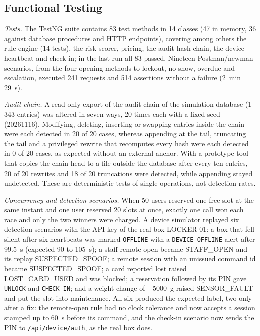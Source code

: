 \documentclass[manuscript,screen]{acmart}
\begin{document}
\subsection{Functional Testing}\label{sec:functional}

\textit{Tests.} The TestNG suite contains 83 test methods in 14 classes (47 in memory, 36 against database procedures
and HTTP endpoints), covering among others the rule engine (14 tests), the risk scorer, pricing, the audit hash chain,
the device heartbeat and check-in; in the last run all 83 passed. Nineteen Postman/newman scenarios, from the four
opening methods to lockout, no-show, overdue and escalation, executed 241 requests and 514 assertions without a failure
(2~min 29~s).

\textit{Audit chain.} A read-only export of the audit chain of the simulation database (1\,343 entries) was altered in
seven ways, 20 times each with a fixed seed (20261116). Modifying, deleting, inserting or swapping entries inside the
chain were each detected in 20 of 20 cases, whereas appending at the tail, truncating the tail and a privileged rewrite
that recomputes every hash were each detected in 0 of 20 cases, as expected without an external anchor. With a prototype tool that copies
the chain head to a file outside the database after every ten entries, 20 of 20 rewrites and 18 of 20 truncations were
detected, while appending stayed undetected. These are deterministic tests of single operations, not detection rates.

\textit{Concurrency and detection scenarios.} When 50 users reserved one free slot at the same instant and one user
reserved 20 slots at once, exactly one call won each race and only the two winners were charged. A device simulator
replayed six detection scenarios with the API key of the real box LOCKER-01:
a box that fell silent after six heartbeats was marked \texttt{OFFLINE} with a \texttt{DEVICE\_OFFLINE} alert after
99.5~s (expected 90 to 105~s); a staff remote open became STAFF\_OPEN and its replay SUSPECTED\_SPOOF; a remote session
with an unissued command id became SUSPECTED\_SPOOF; a card reported lost raised LOST\_CARD\_USED and was blocked; a
reservation followed by its PIN gave \texttt{UNLOCK} and \texttt{CHECK\_IN}; and a weight change of $-5000$~g raised
SENSOR\_FAULT and put the slot into maintenance. All six produced the expected label, two only after a fix: the
remote-open rule had no clock tolerance and now accepts a session stamped up to 60~s before its command, and the
check-in scenario now sends the PIN to \texttt{/api/device/auth}, as the real box does.
\end{document}
